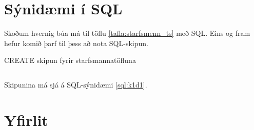 \section{Sýnidæmi í SQL}
\label{undirkafli:synidaemi_i_sql}
Skoðum hvernig búa má til töflu \ref{tafla:starfsmenn_ts} með SQL. Eins og fram hefur komið þarf til þess að nota SQL-skipun.

\begin{sql}[h]
\caption{CREATE skipun fyrir starfsmannatöfluna}
\label{sql:k1d1}
\centering
\inputminted[frame=lines]{sql}{sql/k1d1.sql}
\end{sql}

Skipunina má sjá á SQL-sýnidæmi \ref{sql:k1d1}.

\section{Yfirlit}